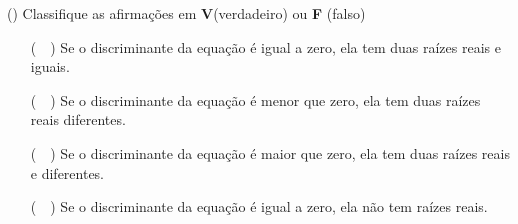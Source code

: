 \begin{question}[type=exam] () %
Classifique as afirmações em \textbf{V}(verdadeiro) ou \textbf{F} (falso)

\begin{itemize}
    \item [(~~)] Se o discriminante da equação é igual a zero, ela tem duas raízes reais e iguais.
    \item [(~~)] Se o discriminante da equação é menor que zero, ela tem duas raízes reais diferentes.
    \item [(~~)] Se o discriminante da equação é maior que zero, ela tem duas raízes reais e diferentes.
    \item [(~~)] Se o discriminante da equação é igual a zero, ela não tem raízes reais.
\end{itemize}
\end{question}
